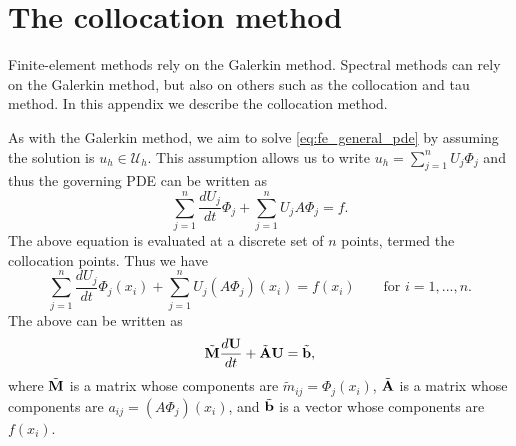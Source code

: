 \documentclass[oneside,a4paper,11pt]{report}
\begin{document}
\chapter{The collocation method}
\label{sec:collocation_method}
Finite-element methods rely on the Galerkin method. Spectral methods can rely on the Galerkin method, but also on others such as the collocation and tau method. In this appendix we describe the collocation method.

As with the Galerkin method, we aim to solve \cref{eq:fe_general_pde} by assuming the solution is $u_h \in \mathcal{U}_h$. This assumption allows us to write $u_h= \sum_{j=1}^n U_j \Phi_j$ and thus the governing PDE can be written as
\begin{equation}
    \sum_{j=1}^n \frac{dU_j}{dt} \Phi_j + \sum_{j=1}^n U_j A\Phi_j = f.
\end{equation}
The above equation is evaluated at a discrete set of $n$ points, termed the collocation points. Thus we have
\begin{equation}
    \sum_{j=1}^n \frac{dU_j}{dt} \Phi_j(x_i) + \sum_{j=1}^n U_j (A\Phi_j)(x_i) = f(x_i) \qquad \text{for }i=1,...,n.
\end{equation}
The above can be written as
\begin{equation}
    \tilde{\mathbf{M}} \frac{d \mathbf{U}}{dt} + \tilde{\mathbf{A}} \mathbf{U} = \tilde{\mathbf{b}},
\end{equation}
where $\tilde{\mathbf{M}}$ is a matrix whose components are $\tilde{m}_{ij} = \Phi_j(x_i)$, $\tilde{\mathbf{A}}$ is a matrix whose components are $a_{ij} = (A\Phi_j)(x_i)$, and $\tilde{\mathbf{b}}$ is a vector whose components are $f(x_i)$.
\end{document}
